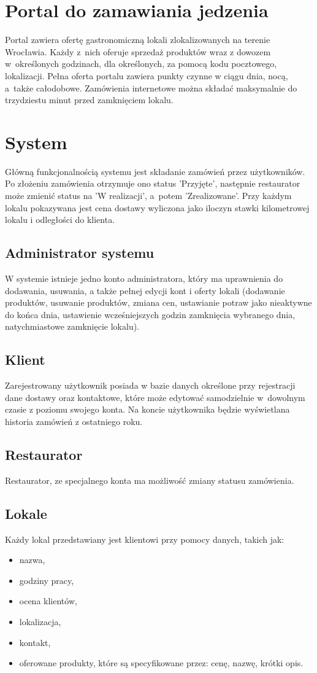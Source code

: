 \documentclass[12pt, a4paper, oneside]{article}
\begin{document}
\section{Portal do zamawiania jedzenia}
\indent\indent Portal zawiera ofertę gastronomiczną lokali zlokalizowanych na terenie Wrocławia. Każdy z~nich oferuje sprzedaż produktów wraz z dowozem w~określonych godzinach, dla określonych, za pomocą kodu pocztowego, lokalizacji. Pełna oferta portalu zawiera punkty czynne w ciągu dnia, nocą, a~także całodobowe. Zamówienia internetowe można składać maksymalnie do trzydziestu minut przed zamknięciem lokalu.
\section{System}
\indent\indent Główną funkcjonalnością systemu jest składanie zamówień przez użytkowników. Po złożeniu zamówienia otrzymuje ono status 'Przyjęte', następnie restaurator może zmienić status na 'W realizacji', a~potem 'Zrealizowane'. Przy każdym lokalu pokazywana jest cena dostawy wyliczona jako iloczyn stawki kilometrowej lokalu i odległości do klienta.
\subsection{Administrator systemu}
\indent\indent W systemie istnieje jedno konto administratora, który ma uprawnienia do dodawania, usuwania, a także pełnej edycji kont i oferty lokali (dodawanie produktów, usuwanie produktów, zmiana cen, ustawianie potraw jako nieaktywne do końca dnia, ustawienie wcześniejszych godzin zamknięcia wybranego dnia, natychmiastowe zamknięcie lokalu).
\subsection{Klient}
\indent\indent Zarejestrowany użytkownik posiada w bazie danych określone przy rejestracji dane dostawy oraz kontaktowe, które może edytować samodzielnie w~dowolnym czasie z poziomu swojego konta. Na koncie użytkownika będzie wyświetlana historia zamówień z ostatniego roku.
\subsection{Restaurator}
\indent\indent Restaurator, ze specjalnego konta ma możliwość zmiany statusu zamówienia.
\subsection{Lokale}
\indent\indent Każdy lokal przedstawiany jest klientowi przy pomocy danych, takich jak:
\begin{itemize}
\item nazwa,
\item godziny pracy,
\item ocena klientów,
\item lokalizacja,
\item kontakt,
\item oferowane produkty, które są specyfikowane przez: cenę, nazwę, krótki opis.
\end{itemize}
\end{document}
